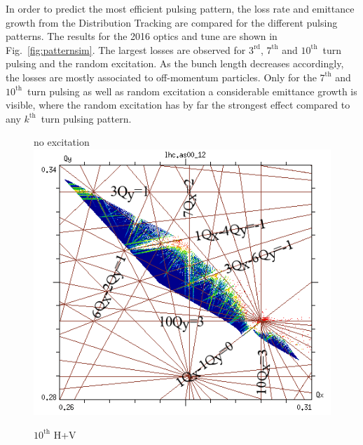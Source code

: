 \documentclass[%
 reprint,
 amsmath,amssymb,
 aps,
prstab,
]{revtex4-1}
\begin{document}
In order to predict the most efficient pulsing pattern, the loss rate and emittance growth from the Distribution Tracking are compared for the different pulsing patterns. The results for the 2016 optics and tune are shown in Fig.~\ref{fig:patternsim}. The largest losses are observed for $3^{\mathrm{rd}}$, $7^{\mathrm{th}}$ and $10^{\mathrm{th}}$~turn pulsing and the random excitation. As the bunch length decreases accordingly, the losses are mostly associated to off-momentum particles. Only for the $7^{\mathrm{th}}$ and $10^{\mathrm{th}}$~turn pulsing as well as random excitation a considerable emittance growth is visible, where the random excitation has by far the strongest effect compared to any $k^{\mathrm{th}}$~turn pulsing pattern. 

\begin{figure}[h]
	\begin{minipage}[t]{0.49\linewidth}
		\centering
		no excitation
		\includegraphics[width=1.0\linewidth]{2016injnocolc15o+19_6noerru_dp0_ord10_annotate.png}
	\end{minipage}
	\begin{minipage}[t]{0.49\linewidth}
		\centering
		$10^{\mathrm{th}}$ H+V

\end{minipage}
\end{figure}
\end{document}
